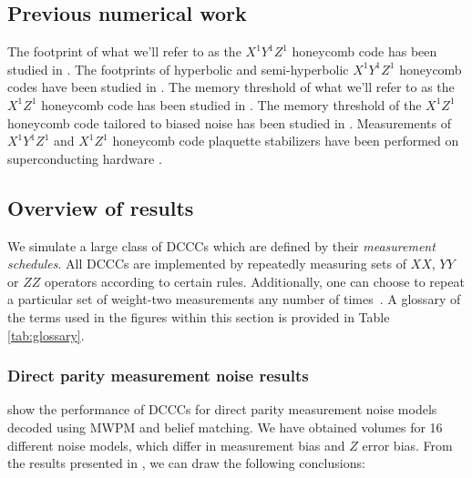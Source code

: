 \subsection{Previous numerical work}\label{subsec:previous-numerical-work}

The footprint of what we'll refer to as the $X^1 Y^1 Z^1$ honeycomb code has been studied in .
The footprints of hyperbolic and semi-hyperbolic $X^1 Y^1 Z^1$ honeycomb codes have been studied in . 
The memory threshold of what we'll refer to as the $X^1 Z^1$ honeycomb code has been studied in . 
The memory threshold of the $X^1 Z^1$ honeycomb code tailored to biased noise has been studied in . 
Measurements of $X^1 Y^1 Z^1$ and $X^1 Z^1$ honeycomb code plaquette stabilizers have been performed on superconducting hardware \cite{wootton2022measurements}.

\subsection{Overview of results}\label{subsec:results}

We simulate a large class of DCCCs which are defined by their \textit{measurement schedules}.
All DCCCs are implemented by repeatedly measuring sets of $XX$, $YY$ or $ZZ$ operators according to certain rules.
Additionally, one can choose to repeat a particular set of weight-two measurements any number of times~\cite{OscarSubsystemGaugeFixing}.
A glossary of the terms used in the figures within this section is provided in Table \ref{tab:glossary}.

\subsubsection{Direct parity measurement noise results}\label{subsubsec:direct-parity-measurement-noise-results}

 show the performance of DCCCs for direct parity measurement noise models decoded using MWPM and belief matching.
We have obtained volumes for 16 different noise models, which differ in measurement bias and $Z$ error bias.
From the results presented in , we can draw the following conclusions:

